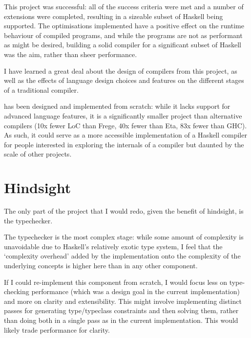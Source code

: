 \documentclass[dissertation.tex]{subfiles}
\begin{document}
This project was successful: all of the success criteria were met and a number of extensions were completed, resulting in a sizeable subset of Haskell being supported. The optimisations implemented have a positive effect on the runtime behaviour of compiled programs, and while the programs are not as performant as might be desired, building a solid compiler for a significant subset of Haskell was the aim, rather than sheer performance.

I have learned a great deal about the design of compilers from this project, as well as the effects of language design choices and features on the different stages of a traditional compiler.

\compilername has been designed and implemented from scratch: while it lacks support for advanced language features, it is a significantly smaller project than alternative compilers (10x fewer LoC than Frege, 40x fewer than Eta, 83x fewer  than GHC). As such, it could serve as a more accessible implementation of a Haskell compiler for people interested in exploring the internals of a compiler but daunted by the scale of other projects.

\section{Hindsight}
{
    The only part of the project that I would redo, given the benefit of hindsight, is the typechecker.

    The typechecker is the most complex stage: while some amount of complexity is unavoidable due to Haskell's relatively exotic type system, I feel that the `complexity overhead' added by the implementation onto the complexity of the underlying concepts is higher here than in any other component.

    If I could re-implement this component from scratch, I would focus less on type-checking performance (which was a design goal in the current implementation) and more on clarity and extensibility. This might involve implementing distinct passes for generating type/typeclass constraints and then solving them, rather than doing both in a single pass as in the current implementation. This would likely trade performance for clarity. 
}
\end{document}
